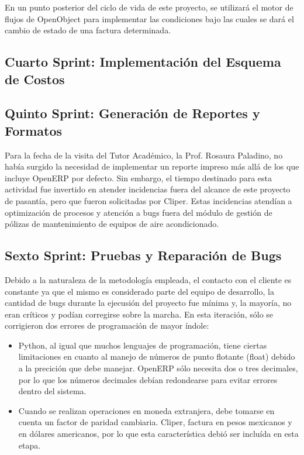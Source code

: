 \documentclass[a4paper, 12pt]{article}
\begin{document}
En un punto posterior del ciclo de vida de este proyecto, se utilizará el motor de flujos de OpenObject para implementar las condiciones bajo las cuales se dará el cambio de estado de una factura determinada.

\subsection{Cuarto Sprint: Implementación del Esquema de Costos}

\subsection{Quinto Sprint: Generación de Reportes y Formatos}
Para la fecha de la visita del Tutor Académico, la Prof. Rosaura Paladino, no había surgido la necesidad de implementar un reporte impreso más allá de los que incluye OpenERP por defecto. Sin embargo, el tiempo destinado para esta actividad fue invertido en atender incidencias fuera del alcance de este proyecto de pasantía, pero que fueron solicitadas por Cliper. Estas incidencias atendían a optimización de procesos y atención a bugs fuera del módulo de gestión de pólizas de mantenimiento de equipos de aire acondicionado.

\subsection{Sexto Sprint: Pruebas y Reparación de Bugs}
Debido a la naturaleza de la metodología empleada, el contacto con el cliente es constante ya que el mismo es considerado parte del equipo de desarrollo, la cantidad de bugs durante la ejecusión del proyecto fue mínima y, la mayoría, no eran críticos y podían corregirse sobre la marcha. En esta iteración, sólo se corrigieron dos errores de programación de mayor índole:
\begin{itemize}
    \item Python, al igual que muchos lenguajes de programación, tiene ciertas limitaciones en cuanto al manejo de números de punto flotante (float) debido a la precición que debe manejar. OpenERP sólo necesita dos o tres decimales, por lo que los números decimales debían redondearse para evitar errores dentro del sistema.
    \item Cuando se realizan operaciones en moneda extranjera, debe tomarse en cuenta un factor de paridad cambiaria. Cliper, factura en pesos mexicanos y en dólares americanos, por lo que esta característica debió ser incluída en esta etapa.
\end{itemize}
\end{document}
